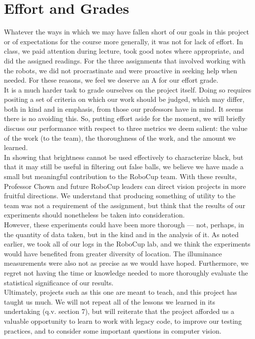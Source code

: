 \documentclass[11pt, twocolumn]{article}
\begin{document}
{\section{Effort and Grades}
Whatever the ways in which we may have fallen short of our goals in this project or of expectations for the course more generally, it was not for lack of effort. In class, we paid attention during lecture, took good notes where appropriate, and did the assigned readings. For the three assignments that involved working with the robots, we did not procrastinate and were proactive in seeking help when needed. For these reasons, we feel we deserve an A for our effort grade. \\
\indent It is a much harder task to grade ourselves on the project itself. Doing so requires positing a set of criteria on which our work should be judged, which may differ, both in kind and in emphasis, from those our professors have in mind. It seems there is no avoiding this. So, putting effort aside for the moment, we will briefly discuss our performance with respect to three metrics we deem salient: the value of the work (to the team), the thoroughness of the work, and the amount we learned. \\
\indent In showing that brightness cannot be used effectively to characterize black, but that it may still be useful in filtering out false balls, we believe we have made a small but meaningful contribution to the RoboCup team. With these results, Professor Chown and future RoboCup leaders can direct vision projects in more fruitful directions. We understand that producing something of utility to the team was not a requirement of the assignment, but think that the results of our experiments should nonetheless be taken into consideration. \\
\indent However, these experiments could have been more thorough --- not, perhaps, in the quantity of data taken, but in the kind and in the analysis of it. As noted earlier, we took all of our logs in the RoboCup lab, and we think the experiments would have benefited from greater diversity of location. The illuminance measurements were also not as precise as we would have hoped. Furthermore, we regret not having the time or knowledge needed to more thoroughly evaluate the statistical significance of our results. \\
\indent Ultimately, projects such as this one are meant to teach, and this project has taught us much. We will not repeat all of the lessons we learned in its undertaking (q.v. section 7), but will reiterate that the project afforded us a valuable opportunity to learn to work with legacy code, to improve our testing practices, and to consider some important questions in computer vision. \\
}
\end{document}
